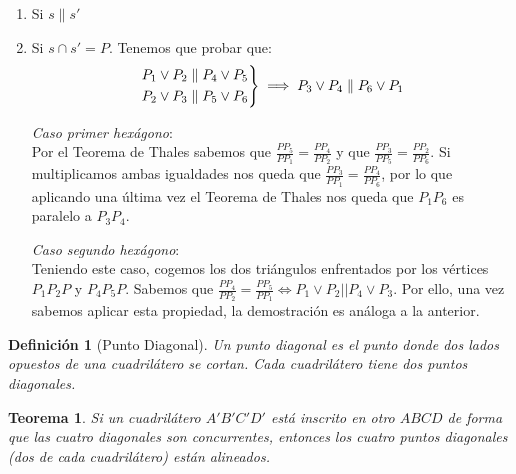 \documentclass[11pt, a4paper]{article}
\makeatletter
\newif\IfInSansMode
\let\oldsf\sffamily
\renewcommand*{\sffamily}{\oldsf\mathversion{sans}\InSansModetrue}
\let\oldnorm\normalfont
\renewcommand*{\normalfont}{\oldnorm\InSansModefalse\mathversion{normal}}
\renewenvironment{proof}[1][\proofname] {\vspace{-15pt}\par\pushQED{\qed}\normalfont\topsep6\p@\@plus6\p@\relax\trivlist\item[\hskip\labelsep\it#1\@addpunct{.}]\ignorespaces}{\popQED\endtrivlist\@endpefalse}
\renewenvironment{proof}[1][\proofname] {\par\pushQED{\qed}\normalfont\topsep6\p@\@plus6\p@\relax\trivlist\item[\hskip\labelsep\itshape\sffamily#1\@addpunct{.}]\ignorespaces}{\popQED\endtrivlist\@endpefalse}
\theoremstyle{theorem-style}
\newtheorem{nth}{Teorema}[section]
\theoremstyle{definition-style}
\newtheorem{ndef}{Definición}[section]
\theoremstyle{remark-style}
\theoremstyle{example-style}
\newenvironment{nlist}
{\begin{enumerate}
    \renewcommand\labelenumi{(\emph{\roman{enumi})}}}
  {\end{enumerate}}
\newenvironment{rcases}
{\left.\begin{aligned}}
    {\end{aligned}\right\rbrace}
\makeatother
\begin{document}
\begin{proof}[Demostración de la versión afín]\hfill


\begin{nlist}
	\item Si $s \parallel s'$ %
	\item Si $s\cap s' = P$. Tenemos que probar que:
	$$\begin{rcases}
	P_1\vee P_2 \parallel P_4 \vee P_5\\
	P_2\vee P_3 \parallel P_5 \vee P_6
\end{rcases}\implies P_3 \vee P_4 \parallel P_6 \vee P_1 $$

\textit{Caso primer hexágono}:\\ %
Por el Teorema de Thales sabemos que $\frac{PP_5}{PP_1}=\frac{PP_4}{PP_2}$ y que $\frac{PP_3}{PP_5}=\frac{PP_2}{PP_6}$. Si multiplicamos ambas igualdades nos queda que $\frac{PP_3}{PP_1} = \frac{PP_4}{PP_6}$, por lo que aplicando una última vez el Teorema de Thales nos queda que $P_1 P_6$ es paralelo a $P_3 P_4$.

\textit{Caso segundo hexágono}:\\
Teniendo este caso, cogemos los dos triángulos enfrentados por los vértices $P_1P_2P$ y $P_4P_5P$.  Sabemos %
que $\frac{PP_4}{PP_2} = \frac{PP_5}{PP_1} \iff P_1\vee P_2 || P_4\vee P_3$. Por ello, una vez sabemos aplicar esta propiedad, la demostración es análoga a la anterior.
\end{nlist}
\end{proof}



\begin{ndef}[Punto Diagonal]
	Un punto diagonal es el punto donde dos lados opuestos de una cuadrilátero se cortan. Cada cuadrilátero tiene dos puntos diagonales.
\end{ndef}

\begin{nth}
    Si un cuadrilátero $A'B'C'D'$ está inscrito en otro $ABCD$ de forma que las cuatro diagonales son concurrentes, entonces los cuatro puntos diagonales (dos de cada cuadrilátero) están alineados.
\end{nth} 
\end{document}
